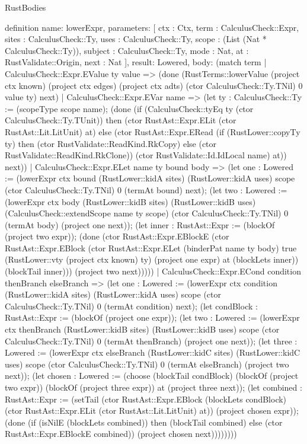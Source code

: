 \begin{lexlean}{RustBodies}
\begin{semanticmodule}
definition{
  name: lowerExpr,
  parameters: [
    ctx : Ctx,
    term : CalculusCheck::Expr,
    sites : CalculusCheck::Ty,
    uses : CalculusCheck::Ty,
    scope : (List (Nat * CalculusCheck::Ty)),
    subject : CalculusCheck::Ty,
    mode : Nat,
    at : RustValidate::Origin,
    next : Nat
  ],
  result: Lowered,
  body: (match term
    | CalculusCheck::Expr.EValue ty value => (done (RustTerms::lowerValue (project ctx known) (project ctx edges) (project ctx adts) (ctor CalculusCheck::Ty.TNil) 0 value ty) next)
    | CalculusCheck::Expr.EVar name => (let ty : CalculusCheck::Ty := (scopeType scope name); (done (if (CalculusCheck::tyEq ty (ctor CalculusCheck::Ty.TUnit)) then (ctor RustAst::Expr.ELit (ctor RustAst::Lit.LitUnit) at) else (ctor RustAst::Expr.ERead (if (RustLower::copyTy ty) then (ctor RustValidate::ReadKind.RkCopy) else (ctor RustValidate::ReadKind.RkClone)) (ctor RustValidate::Id.IdLocal name) at)) next))
    | CalculusCheck::Expr.ELet name ty bound body => (let one : Lowered := (lowerExpr ctx bound (RustLower::kidA sites) (RustLower::kidA uses) scope (ctor CalculusCheck::Ty.TNil) 0 (termAt bound) next); (let two : Lowered := (lowerExpr ctx body (RustLower::kidB sites) (RustLower::kidB uses) (CalculusCheck::extendScope name ty scope) (ctor CalculusCheck::Ty.TNil) 0 (termAt body) (project one next)); (let inner : RustAst::Expr := (blockOf (project two expr)); (done (ctor RustAst::Expr.EBlockE (ctor RustAst::Expr.EBlock (ctor RustAst::Expr.ELet (binderPat name ty body) true (RustLower::vty (project ctx known) ty) (project one expr) at (blockLets inner)) (blockTail inner))) (project two next)))))
    | CalculusCheck::Expr.ECond condition thenBranch elseBranch => (let one : Lowered := (lowerExpr ctx condition (RustLower::kidA sites) (RustLower::kidA uses) scope (ctor CalculusCheck::Ty.TNil) 0 (termAt condition) next); (let condBlock : RustAst::Expr := (blockOf (project one expr)); (let two : Lowered := (lowerExpr ctx thenBranch (RustLower::kidB sites) (RustLower::kidB uses) scope (ctor CalculusCheck::Ty.TNil) 0 (termAt thenBranch) (project one next)); (let three : Lowered := (lowerExpr ctx elseBranch (RustLower::kidC sites) (RustLower::kidC uses) scope (ctor CalculusCheck::Ty.TNil) 0 (termAt elseBranch) (project two next)); (let chosen : Lowered := (choose (blockTail condBlock) (blockOf (project two expr)) (blockOf (project three expr)) at (project three next)); (let combined : RustAst::Expr := (setTail (ctor RustAst::Expr.EBlock (blockLets condBlock) (ctor RustAst::Expr.ELit (ctor RustAst::Lit.LitUnit) at)) (project chosen expr)); (done (if (isNilE (blockLets combined)) then (blockTail combined) else (ctor RustAst::Expr.EBlockE combined)) (project chosen next))))))))
}
\end{semanticmodule}
\end{lexlean}
